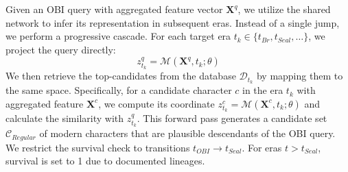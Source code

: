 \documentclass{article}
\newcommand{\stageheader}[1]{%
  \STATE\hspace*{-\fboxsep}%
  \colorbox{gray!20}{%
    \makebox[\dimexpr\linewidth\relax][l]{%
      \hspace*{\fboxsep}\textit{// #1}\hspace*{\linewidth-\widthof{\textit{// #1}}-2\fboxsep}%
    }%
  }%
  \hspace*{-\fboxsep}%
}
\begin{document}


Given an OBI query with aggregated feature vector $\mathbf{X}^q$, we utilize the shared network to infer its representation in subsequent eras. Instead of a single jump, we perform a progressive cascade. For each target era $t_{k} \in \{t_{Br}, t_{Seal}, \dots\}$, we project the query directly: 
\begin{equation}
    z_{t_k}^q = \mathcal{M}(\mathbf{X}^q, t_{k}; \theta)
\end{equation}
We then retrieve the top-candidates from the database $\mathcal{D}_{t_k}$ by mapping them to the same space. Specifically, for a candidate character $c$ in the era $t_k$ with aggregated feature $\mathbf{X}^c$, we compute its coordinate $z_{t_k}^c = \mathcal{M}(\mathbf{X}^c, t_{k}; \theta)$ and calculate the similarity with $z_{t_k}^q$. This forward pass generates a candidate set $\mathcal{C}_{Regular}$ of modern characters that are plausible descendants of the OBI query. We restrict the survival check to transitions $t_{OBI} \to t_{Seal}$. For eras $t > t_{Seal}$, survival is set to 1 due to documented lineages.
\end{document}
